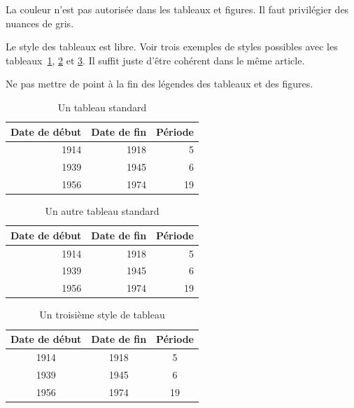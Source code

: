 \documentclass[utf8x]{article-hermes_frenchb}
\begin{document}
La couleur n'est pas autorisée dans les tableaux et figures. Il faut privilégier des nuances de gris.

Le style des tableaux est libre.
Voir trois exemples de styles possibles avec les
tableaux~\ref{tableau1},
\ref{tableau1bis} et
\ref{tableau2}.
Il suffit juste d'être cohérent dans le même article.

Ne pas mettre de point à la fin des légendes des tableaux et des figures.

\begin{table}[ht]
    \begin{center}
        \begin{tabular}{|r|r|r|}
            \hline
                \rule{0pt}{12pt}{Date de début} & Date de fin & Période\\[2pt]
            \hline
            \hline
                \rule{0pt}{12pt}{1914} & 1918 & 5 \\
                1939 & 1945 & 6 \\
                1956 & 1974 & 19 \\[2pt]
            \hline
        \end{tabular}
    \end{center}
    \caption{Un tableau standard}\label{tableau1}
\end{table}


\begin{table}[ht]
    \begin{center}
        \begin{tabular}{r|r|r}
                \rule{0pt}{12pt}{Date de début} & Date de fin & Période\\[2pt]
            \hline
                \rule{0pt}{12pt}{1914} & 1918 & 5 \\
                1939 & 1945 & 6 \\
                1956 & 1974 & 19 \\[2pt]
        \end{tabular}
    \end{center}
    \caption{Un autre tableau standard}\label{tableau1bis}
\end{table}


\begin{table}[ht]
    \begin{center}
        \begin{tabular}{|c|c|c|}
            \hline
                Date de début & Date de fin & Période\\
            \hline
                1914 & 1918 & 5 \\
                1939 & 1945 & 6 \\
                1956 & 1974 & 19 \\
            \hline
        \end{tabular}
    \end{center}
    \caption{Un troisième style de tableau}\label{tableau2}
\end{table}
\end{document}
